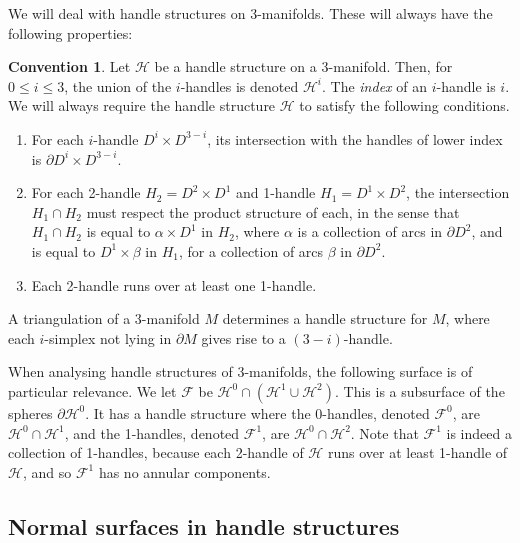 \documentclass[oneside]{amsart}
\numberwithin{equation}{section}
\theoremstyle{plain}
\theoremstyle{definition}
\newtheorem{convention}[equation]{Convention}
\begin{document}
We will deal with handle structures on 3-manifolds. These will always have the following properties:

\begin{convention}
\label{Convention:HS}
Let $\mathcal{H}$ be a handle structure on a 3-manifold. Then, for $0 \leq i \leq 3$,
the union of the $i$-handles is denoted $\mathcal{H}^i$. The \emph{index} of an $i$-handle is $i$.
We will always require the handle structure $\mathcal{H}$ to satisfy the following conditions.
\begin{enumerate}
\item For each $i$-handle $D^i \times D^{3-i}$, its intersection with the handles of lower index is
$\partial D^i \times D^{3-i}$.
\item For each 2-handle $H_2 = D^2 \times D^1$ and 1-handle $H_1 = D^1 \times D^2$, 
the intersection $H_1 \cap H_2$ must respect the product structure of each, in the sense that $H_1 \cap H_2$ is
equal to $\alpha \times D^1$ in $H_2$, where $\alpha$ is a collection of arcs in $\partial D^2$, and is equal to
$D^1 \times \beta$ in $H_1$, for a collection of arcs $\beta$ in $\partial D^2$.
\item Each 2-handle runs over at least one 1-handle.
\end{enumerate}
\end{convention}

A triangulation of a 3-manifold $M$ determines a handle structure for $M$, where each $i$-simplex not lying
in $\partial M$ gives rise to a $(3-i)$-handle.

When analysing handle structures of 3-manifolds, the following surface is of particular relevance.
We let $\mathcal{F}$ be $\mathcal{H}^0 \cap (\mathcal{H}^1 \cup \mathcal{H}^2)$. This is a subsurface
of the spheres $\partial \mathcal{H}^0$. It has a handle
structure where the 0-handles, denoted $\mathcal{F}^0$, are $\mathcal{H}^0 \cap \mathcal{H}^1$,
and the 1-handles, denoted $\mathcal{F}^1$, are $\mathcal{H}^0 \cap \mathcal{H}^2$.
Note that $\mathcal{F}^1$ is indeed a collection of 1-handles, because each 2-handle
of $\mathcal{H}$ runs over at least 1-handle of $\mathcal{H}$, and so $\mathcal{F}^1$
has no annular components.

\subsection{Normal surfaces in handle structures}
\label{Sec:NormalHS}
\end{document}
